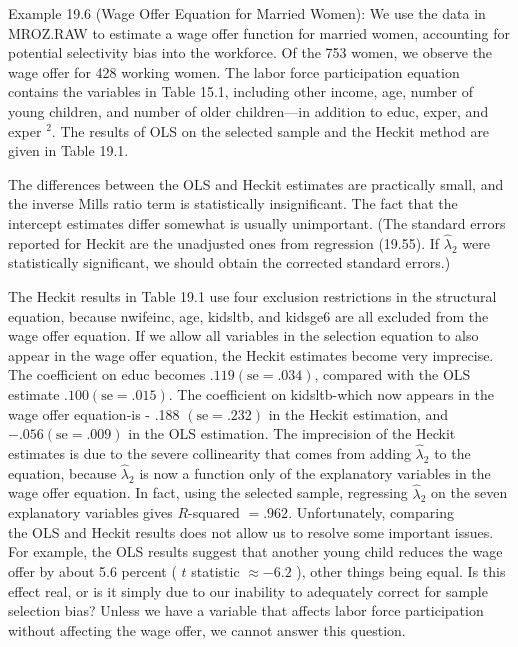 \documentclass[10pt]{article}
\begin{document}
Example 19.6 (Wage Offer Equation for Married Women): We use the data in MROZ.RAW to estimate a wage offer function for married women, accounting for potential selectivity bias into the workforce. Of the 753 women, we observe the wage offer for 428 working women. The labor force participation equation contains the variables in Table 15.1, including other income, age, number of young children, and number of older children—in addition to educ, exper, and exper ${ }^{2}$. The results of OLS on the selected sample and the Heckit method are given in Table 19.1.

The differences between the OLS and Heckit estimates are practically small, and the inverse Mills ratio term is statistically insignificant. The fact that the intercept estimates differ somewhat is usually unimportant. (The standard errors reported for Heckit are the unadjusted ones from regression (19.55). If $\hat{\lambda}_{2}$ were statistically significant, we should obtain the corrected standard errors.)

The Heckit results in Table 19.1 use four exclusion restrictions in the structural equation, because nwifeinc, age, kidsltb, and kidsge6 are all excluded from the wage offer equation. If we allow all variables in the selection equation to also appear in the wage offer equation, the Heckit estimates become very imprecise. The coefficient on educ becomes $.119(\mathrm{se}=.034)$, compared with the OLS estimate $.100(\mathrm{se}=.015)$. The coefficient on kidsltb-which now appears in the wage offer equation-is - .188 $(\mathrm{se}=.232)$ in the Heckit estimation, and $-.056(\mathrm{se}=.009)$ in the OLS estimation. The imprecision of the Heckit estimates is due to the severe collinearity that comes from adding $\hat{\lambda}_{2}$ to the equation, because $\hat{\lambda}_{2}$ is now a function only of the explanatory variables in the wage offer equation. In fact, using the selected sample, regressing $\hat{\lambda}_{2}$ on the seven explanatory variables gives $R$-squared $=.962$. Unfortunately, comparing\\
the OLS and Heckit results does not allow us to resolve some important issues. For example, the OLS results suggest that another young child reduces the wage offer by about 5.6 percent ( $t$ statistic $\approx-6.2$ ), other things being equal. Is this effect real, or is it simply due to our inability to adequately correct for sample selection bias? Unless we have a variable that affects labor force participation without affecting the wage offer, we cannot answer this question.
\end{document}
